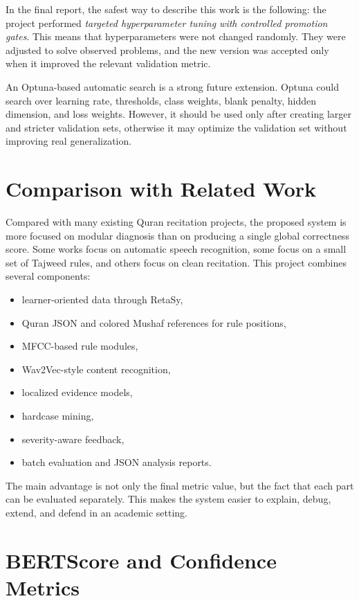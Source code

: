 \documentclass[12pt,a4paper]{report}
\begin{document}
In the final report, the safest way to describe this work is the following:
the project performed \textit{targeted hyperparameter tuning with controlled
promotion gates}. This means that hyperparameters were not changed randomly.
They were adjusted to solve observed problems, and the new version was accepted
only when it improved the relevant validation metric.

An Optuna-based automatic search is a strong future extension. Optuna could
search over learning rate, thresholds, class weights, blank penalty, hidden
dimension, and loss weights. However, it should be used only after creating
larger and stricter validation sets, otherwise it may optimize the validation
set without improving real generalization.

\section{Comparison with Related Work}

Compared with many existing Quran recitation projects, the proposed system is
more focused on modular diagnosis than on producing a single global correctness
score. Some works focus on automatic speech recognition, some focus on a small
set of Tajweed rules, and others focus on clean recitation. This project
combines several components:

\begin{itemize}[leftmargin=*]
    \item learner-oriented data through RetaSy,
    \item Quran JSON and colored Mushaf references for rule positions,
    \item MFCC-based rule modules,
    \item Wav2Vec-style content recognition,
    \item localized evidence models,
    \item hardcase mining,
    \item severity-aware feedback,
    \item batch evaluation and JSON analysis reports.
\end{itemize}

The main advantage is not only the final metric value, but the fact that each
part can be evaluated separately. This makes the system easier to explain,
debug, extend, and defend in an academic setting.

\section{BERTScore and Confidence Metrics}
\end{document}
